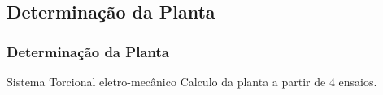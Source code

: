 \documentclass{beamer}
\begin{document}
\subsection{Determinação da Planta}
\begin{frame}
\frametitle{Determinação da Planta}
	\begin{block}{Sistema Torcional eletro-mecânico}
		Calculo da planta a partir de 4 ensaios.
	\begin{center}
	\end{center}
	\end{block}
\end{frame}
\end{document}
